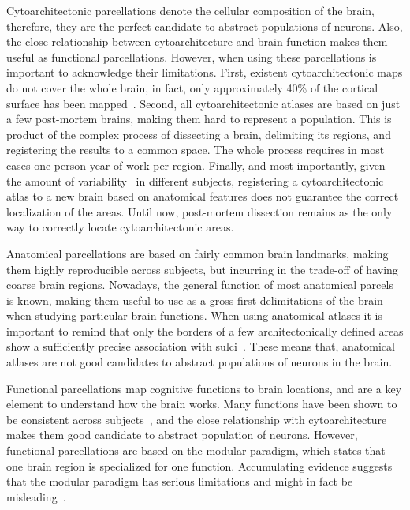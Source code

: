 Cytoarchitectonic parcellations denote the cellular composition of the brain,
therefore, they are the perfect candidate to abstract populations of neurons.
Also, the close relationship between cytoarchitecture and brain function\cite{Amunts2007}
makes them useful as functional parcellations.
However, when using these parcellations is important to acknowledge their limitations.
First, existent cytoarchitectonic maps do not cover the whole brain, in fact, only 
approximately 40\% of the cortical surface has been mapped~\cite{Amunts2007}. Second, all cytoarchitectonic atlases are based on just
a few post-mortem brains, making them hard to represent a population. This is
product of the complex process of dissecting a brain, delimiting its regions,
and registering the results to a common space. The whole process requires in most
cases one person year of work per region. Finally, and most importantly, given the
amount of variability~\cite{Zilles2013} in different subjects, registering a 
cytoarchitectonic atlas to a new brain based on anatomical features does not
guarantee the correct localization of the areas. Until now, post-mortem dissection
remains as the only way to correctly locate cytoarchitectonic areas.

Anatomical parcellations are based on fairly common brain landmarks, making them
highly reproducible across subjects, but incurring in the trade-off of having coarse
brain regions. Nowadays, the general function of most anatomical parcels is
known, making them useful to use as a gross first delimitations of the brain
when studying particular brain functions. When using anatomical atlases it is
important to remind that only the borders of a few architectonically
defined areas show a sufficiently precise association with sulci~\cite{Amunts2007}.
These means that, anatomical atlases are not good candidates to abstract populations
of neurons in the brain.

Functional parcellations map cognitive functions to brain locations, and are
a key element to understand how the brain works. Many functions have been shown
to be consistent across subjects~\cite{Johns, Penfield1954, Yeo2011},
and the close relationship with cytoarchitecture makes them good candidate to
abstract population of neurons. However, functional parcellations are based
on the modular paradigm, which states that one brain region is specialized
for one function. Accumulating evidence suggests that the modular paradigm
has serious limitations and might in fact be misleading~\cite{Bressler2010}.

